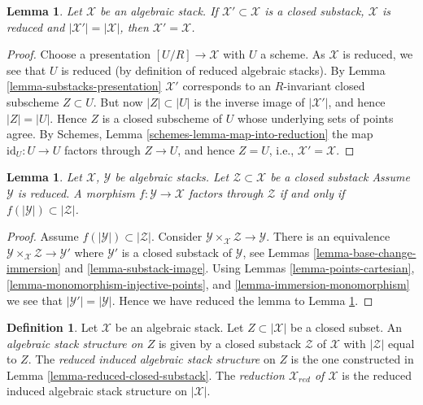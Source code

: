 \documentclass{stacks-project}
\theoremstyle{plain}
\newtheorem{lemma}[subsection]{Lemma}
\theoremstyle{definition}
\newtheorem{definition}[subsection]{Definition}
\theoremstyle{remark}
\numberwithin{equation}{subsection}
\begin{document}
\begin{lemma}
\label{lemma-reduced-stack-determined-by-points}
Let $\mathcal{X}$ be an algebraic stack.
If $\mathcal{X}' \subset \mathcal{X}$
is a closed substack, $\mathcal{X}$ is reduced and
$|\mathcal{X}'| = |\mathcal{X}|$, then $\mathcal{X}' = \mathcal{X}$.
\end{lemma}

\begin{proof}
Choose a presentation $[U/R] \to \mathcal{X}$ with $U$ a scheme.
As $\mathcal{X}$ is reduced, we see that $U$ is reduced (by definition
of reduced algebraic stacks). By
Lemma \ref{lemma-substacks-presentation}
$\mathcal{X}'$ corresponds to an $R$-invariant closed subscheme $Z \subset U$.
But now $|Z| \subset |U|$ is the inverse image of $|\mathcal{X}'|$, and
hence $|Z| = |U|$. Hence $Z$ is a closed subscheme of $U$ whose underlying
sets of points agree. By
Schemes, Lemma \ref{schemes-lemma-map-into-reduction}
the map $\text{id}_U : U \to U$ factors through $Z \to U$, and hence
$Z = U$, i.e., $\mathcal{X}' = \mathcal{X}$.
\end{proof}

\begin{lemma}
\label{lemma-map-into-reduction}
Let $\mathcal{X}$, $\mathcal{Y}$ be algebraic stacks.
Let $\mathcal{Z} \subset \mathcal{X}$ be a closed substack
Assume $\mathcal{Y}$ is reduced.
A morphism $f : \mathcal{Y} \to \mathcal{X}$ factors through
$\mathcal{Z}$ if and only if
$f(|\mathcal{Y}|) \subset |\mathcal{Z}|$.
\end{lemma}

\begin{proof}
Assume $f(|\mathcal{Y}|) \subset |\mathcal{Z}|$. Consider
$\mathcal{Y} \times_\mathcal{X} \mathcal{Z} \to \mathcal{Y}$.
There is an equivalence
$\mathcal{Y} \times_\mathcal{X} \mathcal{Z} \to \mathcal{Y}'$
where $\mathcal{Y}'$ is a closed substack of $\mathcal{Y}$, see
Lemmas \ref{lemma-base-change-immersion} and
\ref{lemma-substack-image}.
Using
Lemmas \ref{lemma-points-cartesian},
\ref{lemma-monomorphism-injective-points}, and
\ref{lemma-immersion-monomorphism}
we see that $|\mathcal{Y}'| = |\mathcal{Y}|$. Hence we have
reduced the lemma to
Lemma \ref{lemma-reduced-stack-determined-by-points}.
\end{proof}

\begin{definition}
\label{definition-reduced-induced-stack}
Let $\mathcal{X}$ be an algebraic stack.
Let $Z \subset |\mathcal{X}|$ be a closed subset.
An {\it algebraic stack structure on $Z$} is given by a closed substack
$\mathcal{Z}$ of $\mathcal{X}$ with $|\mathcal{Z}|$ equal to $Z$.
The {\it reduced induced algebraic stack structure}
on $Z$ is the one constructed in
Lemma \ref{lemma-reduced-closed-substack}.
The {\it reduction $\mathcal{X}_{red}$ of $\mathcal{X}$}
is the reduced induced algebraic stack structure on $|\mathcal{X}|$.
\end{definition}
\end{document}
